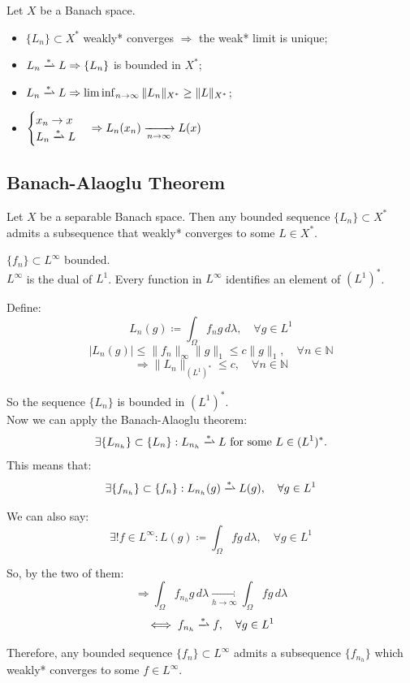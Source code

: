 \begin{theorem}
Let $X$ be a Banach space.
\begin{itemize}
\item $\{L_n\} \subset X^*$ weakly* converges $\Rightarrow$ the weak* limit is unique;
\item $L_n \xrightharpoonup{\ast} L \Rightarrow \{L_n\}$ is bounded in $X^*$;
\item $L_n \xrightharpoonup{\ast} L \Rightarrow \liminf_{n \to \infty} \|L_n\|_{X^*} \geq \|L\|_{X^*}$;
\item $\begin{cases} x_n \to x \\ L_n \xrightharpoonup{\ast} L \end{cases} \Rightarrow L_n(x_n) \xrightarrow[n \to \infty]{} L(x)$
\end{itemize}
\end{theorem}

\clearpage
\subsection{Banach-Alaoglu Theorem}

\begin{theorem}
Let $X$ be a separable Banach space. Then any bounded sequence $\{L_n\} \subset X^*$ admits a subsequence that weakly* converges to some $L \in X^*$.
\end{theorem}

\begin{remark}
$\{f_n\} \subset L^\infty$ bounded. \\
$L^\infty$ is the dual of $L^1$. Every function in $L^\infty$ identifies an element of $(L^1)^*$.

Define:
\[
L_n(g) \coloneqq \int_\Omega f_n g \, d\lambda, \quad \forall g \in L^1
\]
\[
|L_n(g)| \leq \|f_n\|_\infty \|g\|_1 \leq c\|g\|_1, \quad \forall n \in \mathbb{N}
\]
\[
\Rightarrow \|L_n\|_{(L^1)^*} \leq c, \quad \forall n \in \mathbb{N}
\]

So the sequence $\{L_n\}$ is bounded in $(L^1)^*$. \\
Now we can apply the Banach-Alaoglu theorem:
\[
\exists \{L_{n_h}\} \subset \{L_n\} : L_{n_h} \xrightharpoonup{\ast} L \text{ for some } L \in (L^1)^*.
\]
This means that:
\[
\exists \{f_{n_h}\} \subset \{f_n\} : L_{n_h}(g) \xrightharpoonup{\ast} L(g), \quad \forall g \in L^1
\]

We can also say:
\[
\exists! f \in L^\infty : L(g) \coloneqq \int_\Omega f g \, d\lambda, \quad \forall g \in L^1
\]

So, by the two of them:
\[
\Rightarrow \int_\Omega f_{n_h} g \, d\lambda \xrightarrow[h \to \infty]{} \int_\Omega f g \, d\lambda
\]
\[
\iff f_{n_h} \xrightharpoonup{\ast} f, \quad \forall g \in L^1
\]

Therefore, any bounded sequence $\{f_n\} \subset L^\infty$ admits a subsequence $\{f_{n_h}\}$ which weakly* converges to some $f \in L^\infty$.
\end{remark}

